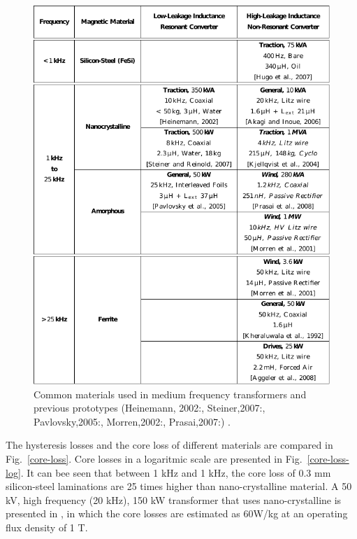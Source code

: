 \documentclass[a4paper, 11pt]{article} %
\begin{document}
\begin{figure}[]
  \centering
    \includegraphics[]{material_table_villar_2010}
  \caption{Common materials used in medium frequency transformers and previous prototypes (Heinemann, 2002:\cite{Heinemann2002}, Steiner,2007:\cite{Steiner2007}, Pavlovsky,2005:\cite{Pavlovsky2005}, Morren,2002:\cite{Morren2002}, Prasai,2007:\cite{Prasai2007}) \cite{Villar2010}.}
  \label{material_table}
\end{figure}

The hysteresis losses and the core loss of different materials are compared in Fig.~\ref{core-loss}. Core losses in a logaritmic scale are presented in Fig.~\ref{core-loss-log}. It can bee seen that between 1 kHz and 1 kHz, the core loss of 0.3 mm silicon-steel laminations are 25 times higher than nano-crystalline material. 
A 50 kV, high frequency (20 kHz), 150 kW transformer that uses nano-crystalline is presented in \cite{Filchev2009}, in which the core losses are estimated as 60W/kg at an operating flux density of 1 T.
\end{document}
